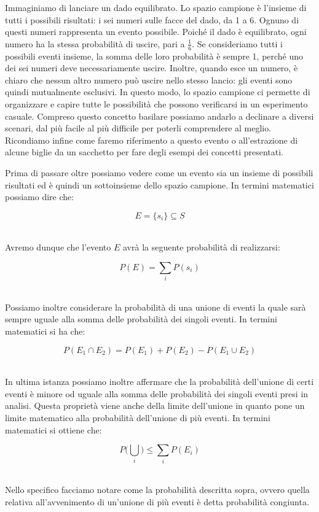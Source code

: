 \documentclass[../main.tex]{subfiles}
\begin{document}
Immaginiamo di lanciare un dado equilibrato. Lo spazio campione è l’insieme di tutti i possibili risultati: i sei numeri sulle facce del dado, da 1 a 6. Ognuno di questi numeri rappresenta un evento possibile. Poiché il dado è equilibrato, ogni numero ha la stessa probabilità di uscire, pari a $\tfrac{1}{6}$. Se consideriamo tutti i possibili eventi insieme, la somma delle loro probabilità è sempre 1, perché uno dei sei numeri deve necessariamente uscire. Inoltre, quando esce un numero, è chiaro che nessun altro numero può uscire nello stesso lancio: gli eventi sono quindi mutualmente esclusivi. In questo modo, lo spazio campione ci permette di organizzare e capire tutte le possibilità che possono verificarsi in un esperimento casuale. Compreso questo concetto basilare possiamo andarlo a declinare a diversi scenari, dal più facile al più difficile per poterli comprendere al meglio.\\

Ricondiamo infine come faremo riferimento a questo evento o all'estrazione di alcune biglie da un sacchetto per fare degli esempi dei concetti presentati.

Prima di passare oltre possiamo vedere come un evento sia un insieme di possibili risultati ed è quindi un sottoinsieme dello spazio campione.
In termini matematici possiamo dire che:

\[ E = \{ s_i \} \subseteq S \]\

Avremo dunque che l'evento $E$ avrà la seguente probabilità di realizzarsi:

\[P(E) = \sum_i P(s_i) \]\

Possiamo inoltre considerare la probabilità di una unione di eventi la quale sarà sempre uguale alla somma delle probabilità dei singoli eventi. In termini matematici si ha che:

\[ P(E_1 \cap E_2 ) = P(E_1) + P(E_2) - P(E_1 \cup E_2 )  \]\

In ultima istanza possiamo inoltre affermare che la probabilità dell'unione di certi eventi è minore od uguale alla somma delle probabilità dei singoli eventi presi in analisi. Questa proprietà viene anche della limite dell'unione in quanto pone un limite matematico alla probabilità dell'unione di più eventi. In termini matematici si ottiene che:

\[ P \bigg( \bigcup_i \bigg) \leq \sum_i P(E_i) \]\

Nello specifico facciamo notare come la probabilità descritta sopra, ovvero quella relativa all'avvenimento di un'unione di più eventi è detta probabilità congiunta.
\end{document}
